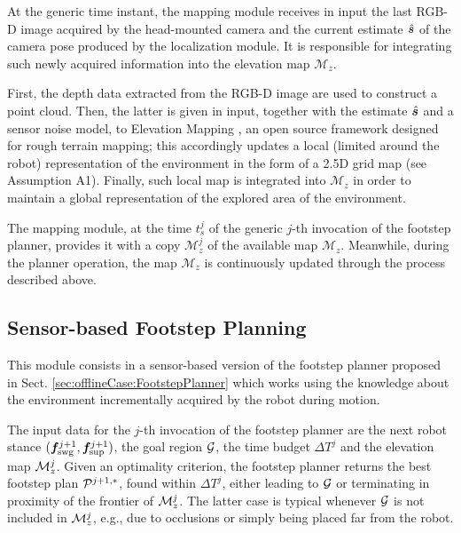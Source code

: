 At the generic time instant, the mapping module receives in input the last RGB-D image acquired by the head-mounted camera and the current estimate $\hat{{\bm{s}}}$ of the camera pose produced by the localization module. 
It is responsible for integrating such newly acquired information into the elevation map
$\mathcal{M}_z$.

First, the depth data extracted from the RGB-D image are used to construct a point cloud.
Then, the latter is given in input, together with the estimate $\hat{{\bm{s}}}$ and a sensor noise model, to Elevation Mapping \cite{FaBlHu:18}, an open source framework designed for rough terrain mapping; this accordingly updates a local (limited around the robot)
representation of the environment in the form of a 2.5D grid map (see Assumption A1).
Finally, such local map is integrated into $\mathcal{M}_z$ in order to maintain a global representation of the explored area of the environment.

The mapping module, at the time $t_s^j$ of the generic $j$-th invocation of the footstep planner, provides it with a copy $\mathcal{M}_z^j$ of the available map $\mathcal{M}_z$.
Meanwhile, during the planner operation, the map $\mathcal{M}_z$ is continuously updated through the process described above.


\subsection{Sensor-based Footstep Planning}
\label{sec:onlineCase:FootstepPlanner}

This module consists in a sensor-based version of the footstep planner proposed in Sect. \ref{sec:offlineCase:FootstepPlanner} which works using the knowledge about the environment incrementally acquired by the robot during motion. 

The input data for the $j$-th invocation of the footstep planner are the next robot stance $({\bm{f}}_{\rm swg}^{j+1}, {\bm{f}}_{\rm sup}^{j+1})$, the goal region $\cal G$, the time budget ${\Delta T}^j$ and the elevation map ${\cal M}_z^j$. 
Given an optimality criterion, the footstep planner returns the best footstep plan ${\cal P}^{j+1,*}$, found within ${\Delta T}^j$, either leading to $\cal G$ or terminating in proximity of the frontier of ${\cal M}_z^j$.
The latter case is typical whenever $\cal G$ is not included in ${\cal M}_z^j$, e.g., due to occlusions or simply being placed far from the robot.

